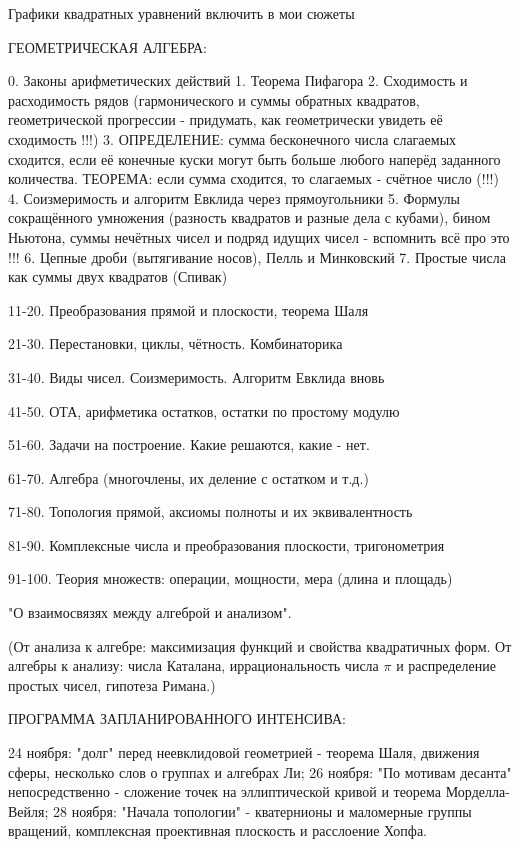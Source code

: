 Графики квадратных уравнений включить в мои сюжеты

ГЕОМЕТРИЧЕСКАЯ АЛГЕБРА:

0. Законы арифметических действий
1. Теорема Пифагора
2. Сходимость и расходимость рядов (гармонического
    и суммы обратных квадратов, геометрической прогрессии
    - придумать, как геометрически увидеть её сходимость !!!)
3. ОПРЕДЕЛЕНИЕ: сумма бесконечного числа слагаемых 
    сходится, если её конечные куски могут быть больше 
    любого наперёд заданного количества. ТЕОРЕМА: если
    сумма сходится, то слагаемых - счётное число (!!!)
4. Соизмеримость и алгоритм Евклида через прямоугольники
5. Формулы сокращённого умножения (разность квадратов
    и разные дела с кубами), бином Ньютона, суммы нечётных 
    чисел и подряд идущих чисел - вспомнить всё про это !!!
6. Цепные дроби (вытягивание носов), Пелль и Минковский
7. Простые числа как суммы двух квадратов (Спивак)

11-20. Преобразования прямой и плоскости, теорема Шаля

21-30. Перестановки, циклы, чётность. Комбинаторика

31-40. Виды чисел. Соизмеримость. Алгоритм Евклида вновь

41-50. ОТА, арифметика остатков, остатки по простому модулю

51-60. Задачи на построение. Какие решаются, какие - нет.

61-70. Алгебра (многочлены, их деление с остатком и т.д.)

71-80. Топология прямой, аксиомы полноты и их эквивалентность

81-90. Комплексные числа и преобразования плоскости, тригонометрия

91-100. Теория множеств: операции, мощности, мера (длина и площадь)

"О взаимосвязях между алгеброй и анализом".

(От анализа к алгебре: максимизация функций и свойства квадратичных 
форм. От алгебры к анализу: числа Каталана, иррациональность числа
$\pi$ и распределение простых чисел, гипотеза Римана.)

ПРОГРАММА ЗАПЛАНИРОВАННОГО ИНТЕНСИВА:

24 ноября: "долг" перед неевклидовой геометрией - теорема Шаля,
движения сферы, несколько слов о группах и алгебрах Ли;
26 ноября: "По мотивам десанта" непосредственно - сложение точек
на эллиптической кривой и теорема Морделла-Вейля;
28 ноября: "Начала топологии" - кватернионы и маломерные группы
вращений, комплексная проективная плоскость и расслоение Хопфа.

